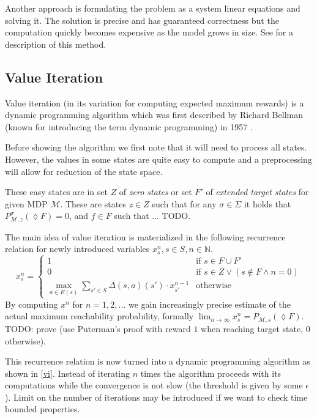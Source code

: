 Another approach is formulating the problem as a system linear equations
and solving it.  The solution is precise and has guaranteed correctness
but the computation quickly becomes expensive as the model grows in
size.  See \parencite{forejt} for a description of this method.

\subsection{Value Iteration}

Value iteration (in its variation for computing expected maximum rewards) is a
dynamic programming algorithm which was first described by Richard
Bellman (known for introducing the term dynamic programming) in 1957
\parencite{bellman}.

Before showing the algorithm we first note that it will need to
process all states. However, the values in some states are quite easy to
compute and a preprocessing will allow for reduction of the
state space.

These easy states are in set $Z$
of {\em zero states} or set $F'$ of {\em extended target states}
for given MDP $\mathcal{M}$. These are states $z
\in Z$ such that for any $\sigma \in \Sigma$ it holds that
$P^\sigma_{\mathcal{M},z}(\lozenge F) = 0$,
and $f \in F$ such that ... TODO.

The main idea of value iteration is materialized in the following
recurrence relation for newly introduced variables $x_s^n, s \in S, n
\in \mathbb{N}$.
\[
x_s^n =
\begin{cases}
    1 & \text{if }s \in F \cup F' \\
    0 & \text{if }s \in Z \lor (s \not \in F \land n = 0) \\
    \max\limits_{a \in E(s)} \sum\limits_{s' \in S} \Delta(s,a)(s') \cdot x_{s'}^{n-1}
    & \text{otherwise} %
\end{cases}
\]
By computing $x^n$ for $n = 1,2,\ldots$ we gain increasingly precise
estimate of the actual maximum reachability probability,
formally $\lim_{n \to \infty} x^n_s = P_{\mathcal{M},s}(\lozenge F)$.
TODO: prove (use Puterman's proof with reward $1$ when reaching target
state, 0 otherwise).

This recurrence relation is now turned into a dynamic programming
algorithm as shown in \autoref{vi}. Instead of iterating $n$ times the
algorithm proceeds with its computations while the convergence is not
slow (the threshold is given by some $\epsilon$). Limit on the number of
iterations may be introduced if we want to check time bounded
properties.

